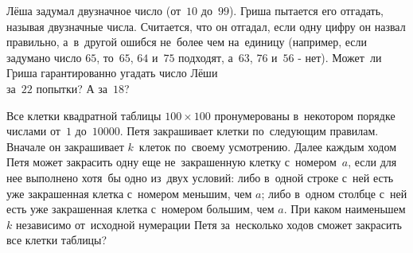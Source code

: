 \begin{problems}
\item
Лёша задумал двузначное число (от~$10$ до~$99$).
Гриша пытается его отгадать, называя двузначные числа.
Считается, что он отгадал, если одну цифру он назвал правильно, а~в~другой
ошибся не~более чем на~единицу (например, если задумано число $65$, то~$65$,
$64$ и~$75$ подходят, а~$63$, $76$ и~$56$ - нет).
Может~ли Гриша гарантированно угадать число Лёши
\\
\subproblem за~$22$ попытки?
\qquad
\subproblem А за~$18$?

\item
Все клетки квадратной таблицы $100 \times 100$ пронумерованы в~некотором
порядке числами от~$1$ до~$10000$.
Петя закрашивает клетки по~следующим правилам.
Вначале он закрашивает $k$~клеток по~своему усмотрению.
Далее каждым ходом Петя может закрасить одну еще не~закрашенную клетку
с~номером~$a$, если для нее выполнено хотя~бы одно из~двух условий: либо
в~одной строке с~ней есть уже закрашенная клетка с~номером меньшим, чем $a$;
либо в~одном столбце с~ней есть уже закрашенная клетка с~номером большим, чем
$a$.
При каком наименьшем $k$ независимо от~исходной нумерации Петя за~несколько
ходов сможет закрасить все клетки таблицы?

\end{problems}

